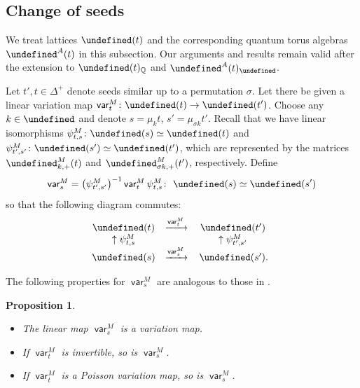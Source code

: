 \documentclass[10pt,a4paper]{amsart}
\newcommand{\Q}{\mathbb{Q}}
\newcommand{\opname}[1]{\operatorname{\mathsf{#1}}}
\newcommand{\var}{\opname{var}}
\newcommand{\ufv}{\opname{uf}}
\let\Mc\undefined
\let\Iufv\undefined
\let\LP\undefined
\let\fFac\undefined
\let\fFacRoot\undefined
\let\trans\undefined
\newcommand{\Mc}{M^\circ}
\newcommand{\Iufv}{I_{\ufv}}
\newcommand{\LP}{{\mathcal{LP}}}
\newcommand{\fFac}{\mathcal{Z}}
\newcommand{\fFacRoot}{\fFac^{\Q}}
\newcommand{\trans}{\opname{P}}
\numberwithin{equation}{section}
\newtheorem{Proposition}[Theorem]{Proposition}
 { \theoremstyle{definition}
\newtheorem{Definition}[Theorem]{Definition}
\newtheorem{Note}[Theorem]{Note}
\newtheorem{Example}[Theorem]{Example}
\newtheorem{Remark}[Theorem]{Remark}
\newtheorem{Assumption}[Theorem]{Assumption}
}
\begin{document}
\subsection{Change of seeds}

We treat lattices $\Mc(t)$ and the corresponding quantum torus algebras
$\LP^A(t)$ in this subsection. Our arguments and results remain valid
after the extension to $\Mc(t)_{\Q}$ and $\LP^A(t)_{\fFacRoot}$.

Let $t',t\in\Delta^{+}$ denote seeds similar up to a permutation
$\sigma$. Let there be given a linear variation map $\var_{t}^{M}\colon\Mc(t)\rightarrow\Mc(t')$.
Choose any $k\in\Iufv$ and denote $s=\mu_{k}t$, ${s'=\mu_{\sigma k}t'}$.
Recall that we have linear isomorphisms $\psi_{t,s}^{M}\colon\Mc(s)\simeq\Mc(t)$
and $\psi_{t',s'}^{M}\colon\Mc(s')\simeq\Mc(t')$, which are represented
by the matrices $\trans_{k,+}^{M}(t)$ and $\trans_{\sigma k,+}^{M}(t')$,
respectively. Define \[\var_{s}^{M}=\big(\psi_{t',s'}^{M}\big)^{-1}\var_{t}^{M}\psi_{t,s}^{M}\colon\ \Mc(s)\simeq\Mc(s')\]
so that the following diagram commutes:
\begin{align}
\begin{array}{@{}ccc}
\Mc(t) & \xrightarrow{\var_{t}^{M}} & \Mc(t')\\
\uparrow\psi_{t,s}^{M} & & \uparrow\psi_{t',s'}^{M}\\
\Mc(s) & \xrightarrow{\var_{s}^{M}} & \,\Mc(s').
\end{array}\label{eq:commute_M_variation}
\end{align}

The following properties for $\var_{s}^{M}$ are analogous to those
in \cite[Proposition 5.1.6]{qin2020dual}.

\begin{Proposition}\label{prop:change_seed_M_variation}\quad
\begin{itemize}\itemsep=0pt
\item[$(1)$] The linear map $\var_{s}^{M}$ is a variation map.
\item[$(2)$] If $\var_{t}^{M}$ is invertible, so is $\var_{s}^{M}$.
\item[$(3)$] If $\var_{t}^{M}$ is a Poisson variation map, so is $\var_{s}^{M}$.
\end{itemize}
\end{Proposition}
\end{document}
